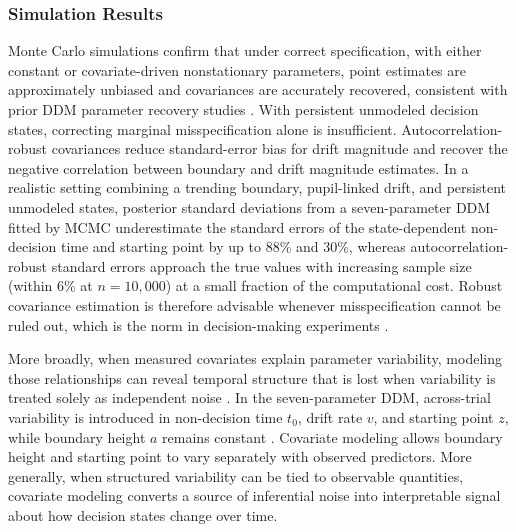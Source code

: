 \documentclass[00-main.tex]{subfiles}
\begin{document}
\subsubsection*{Simulation Results}
Monte Carlo simulations confirm that under correct specification, with either constant or covariate-driven nonstationary parameters, point estimates are approximately unbiased and covariances are accurately recovered, consistent with prior DDM parameter recovery studies \citep{boehm_estimating_2018, matzke_psychological_2009}. With persistent unmodeled decision states, correcting marginal misspecification alone is insufficient. Autocorrelation-robust covariances reduce standard-error bias for drift magnitude and recover the negative correlation between boundary and drift magnitude estimates. In a realistic setting combining a trending boundary, pupil-linked drift, and persistent unmodeled states, posterior standard deviations from a seven-parameter DDM fitted by MCMC underestimate the standard errors of the state-dependent non-decision time and starting point by up to 88\% and 30\%, whereas autocorrelation-robust standard errors approach the true values with increasing sample size (within 6\% at $n=10{,}000$) at a small fraction of the computational cost. Robust covariance estimation is therefore advisable whenever misspecification cannot be ruled out, which is the norm in decision-making experiments \citep{urai_structure_2025, shevinsky_interaction_2019}.

More broadly, when measured covariates explain parameter variability, modeling those relationships can reveal temporal structure that is lost when variability is treated solely as independent noise \citep{duffy_disentangling_2025, urai_structure_2025, roy_efficient_2018, roy_extracting_2021}. In the seven-parameter DDM, across-trial variability is introduced in non-decision time $t_0$, drift rate $v$, and starting point $z$, while boundary height $a$ remains constant \citep{boehm_estimating_2018, lerche_model_2016, ratcliff_internal_2018}. Covariate modeling allows boundary height and starting point to vary separately with observed predictors. More generally, when structured variability can be tied to observable quantities, covariate modeling converts a source of inferential noise into interpretable signal about how decision states change over time.
\end{document}
